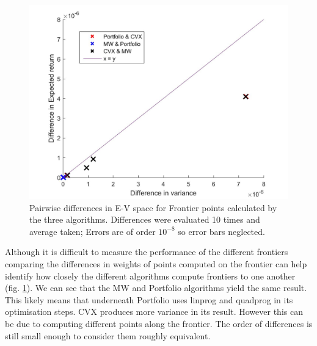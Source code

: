 \documentclass[a4paper,10pt, twocolumn]{article}
\begin{document}
\begin{figure}[t]
	\includegraphics[width=\linewidth]{FrontierDifferences.jpg}
	\centering
	\caption{Pairwise differences in E-V space for Frontier points calculated by the three algorithms. Differences were evaluated 10 times and average taken; Errors are of order $10^{-8}$ so error bars neglected.}
			\label{fig:FrontierDifference}
\end{figure}

Although it is difficult to measure the performance of the different frontiers comparing the differences in weights of points computed on the frontier can help identify how closely the different algorithms compute frontiers to one another (fig. \ref{fig:FrontierDifference}). We can see that the MW and Portfolio algorithms yield the same result. This likely means that underneath Portfolio uses linprog and quadprog in its optimisation steps. CVX produces more variance in its result. However this can be due to computing different points along the frontier. The order of differences is still small enough to consider them roughly equivalent. 
\end{document}
